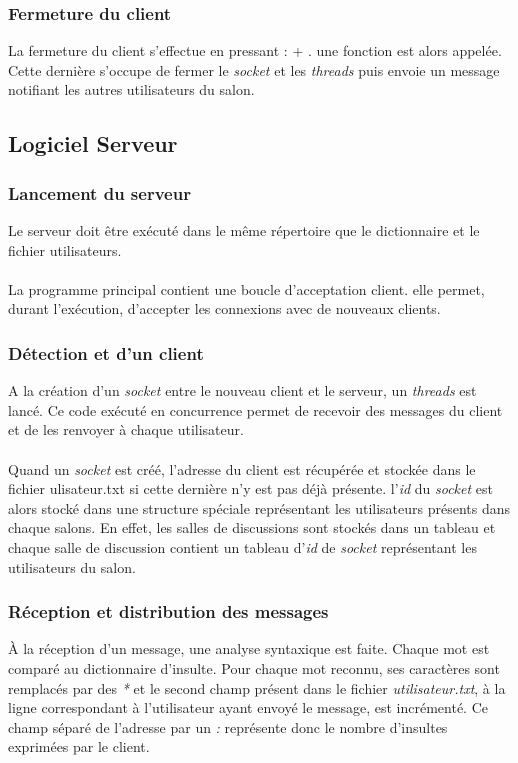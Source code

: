 \documentclass[a4paper, 12pt]{article}
\newcommand{\Touche}[1]{\Ovalbox{#1}}
\begin{document}
\subsubsection{Fermeture du client}
La fermeture du client s'effectue en pressant : \Touche{Ctrl} + \Touche{C}. une fonction est alors appelée. Cette dernière s'occupe de fermer le \emph{socket} et les \emph{threads} puis envoie un message notifiant les autres utilisateurs du salon.

\subsection{Logiciel Serveur}
\subsubsection{Lancement du serveur}
Le serveur doit être exécuté dans le même répertoire que le dictionnaire et le fichier utilisateurs.
\paragraph{}
La programme principal contient une boucle d'acceptation client. elle permet, durant l'exécution, d'accepter les connexions avec de nouveaux clients.

\subsubsection{Détection et d'un client}
A la création d'un \emph{socket} entre le nouveau client et le serveur, un \emph{threads} est lancé. Ce code exécuté en concurrence permet de recevoir des messages du client et  de les renvoyer à chaque utilisateur.
\paragraph{}
Quand un \emph{socket} est créé, l'adresse du client est récupérée et stockée dans le fichier ulisateur.txt si cette dernière n'y est pas déjà présente. l'\emph{id} du \emph{socket} est alors stocké dans une structure spéciale représentant les utilisateurs présents dans chaque salons.
En effet, les salles de discussions sont stockés dans un tableau et chaque salle de discussion contient un tableau d'\emph{id} de \emph{socket} représentant les utilisateurs du salon.

\subsubsection{Réception et distribution des messages}
À la réception d'un message, une analyse syntaxique est faite. Chaque mot est comparé au dictionnaire d'insulte. Pour chaque mot reconnu, ses caractères sont remplacés par des \emph{*} et le second champ présent dans le fichier \emph{utilisateur.txt}, à la ligne correspondant à l'utilisateur ayant envoyé le message, est incrémenté. Ce champ séparé de l'adresse par un \emph{:} représente donc le nombre d'insultes exprimées par le client.
\end{document}
